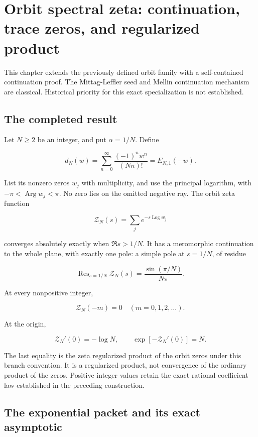 \hypertarget{orbit-spectral-zeta-continuation-trace-zeros-and-regularized-product}{%
\section{Orbit spectral zeta: continuation, trace zeros, and regularized
product}\label{orbit-spectral-zeta-continuation-trace-zeros-and-regularized-product}}

This chapter extends the previously defined orbit family with a self-contained continuation proof.
The Mittag-Leffler seed and Mellin continuation mechanism are classical.
Historical priority for this exact specialization is not established.

\hypertarget{the-completed-result}{%
\subsection{The completed result}\label{the-completed-result}}

Let \(N\ge2\) be an integer, and put \(\alpha=1/N\). Define

\[
d_N(w)=\sum_{n=0}^{\infty}\frac{(-1)^n w^n}{(Nn)!}
      =E_{N,1}(-w).
\]

List its nonzero zeros \(w_j\) with multiplicity, and use the principal
logarithm, with \(-\pi<\operatorname{Arg}w_j<\pi\). No zero lies on the
omitted negative ray. The orbit zeta function

\[
\mathcal Z_N(s)=\sum_j e^{-s\operatorname{Log}w_j}
\]

converges absolutely exactly when \(\Re s>1/N\). It has a meromorphic
continuation to the whole plane, with exactly one pole: a simple pole at
\(s=1/N\), of residue

\[
\boxed{\operatorname{Res}_{s=1/N}\mathcal Z_N(s)
      =\frac{\sin(\pi/N)}{N\pi}.}
\]

At every nonpositive integer,

\[
\boxed{\mathcal Z_N(-m)=0\quad(m=0,1,2,\ldots).}
\]

At the origin,

\[
\boxed{\mathcal Z_N'(0)=-\log N,\qquad
       \exp[-\mathcal Z_N'(0)]=N.}
\]

The last equality is the zeta regularized product of the orbit zeros
under this branch convention. It is a regularized product, not
convergence of the ordinary product of the zeros. Positive integer values retain the exact rational coefficient law established in the preceding construction.

\hypertarget{the-exponential-packet-and-its-exact-asymptotic}{%
\subsection{The exponential packet and its exact
asymptotic}\label{the-exponential-packet-and-its-exact-asymptotic}}


